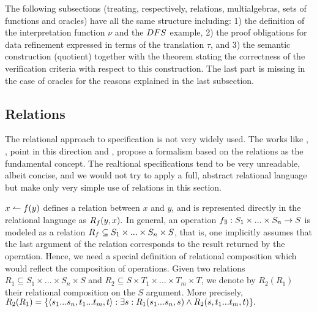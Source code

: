The following subsections (treating, respectively, relations, multialgebras, sets of
functions and oracles) have all the same structure including: 1) the definition of the
interpretation function $\nu$ and the $DFS$ example, 2) the proof obligations
for data refinement expressed in terms of the translation $\tau$, and 3) the semantic construction (quotient) together with the theorem stating the correctness of the verification criteria with respect to this construction. The last part is missing in the case of oracles for the reasons explained in the last subsection.


\subsection{Relations}
The relational approach to specification is not very widely used. The works like \cite{Brnc}, \cite{Brbpl}, \cite{Stark} point in this direction and \cite{Hoog}, \cite{Pers} propose a formalism based on the 
relations as the fundamental concept. The realtional specifications tend to be very unreadable, albeit concise, and we would not try to apply a full, abstract
relational language but make only very simple use of relations in this section.

$x\leftharpoonup f(y)$ defines a relation between $x$ and $y$, and is represented directly in the relational language as $R_{f}(y,x).$ In general, an operation $f_\exists:S_1\times ...\times S_n\rightarrow S$ is modeled as a relation
$R_{f}\subseteq S_1\times ...\times S_n\times S$, that is, one implicitly assumes that the last argument of the relation corresponds to the result returned by the operation. Hence, we need a special definition of relational composition which would reflect the composition of operations. Given two relations $R_1\subseteq S_1\times ...\times S_n\times S$ and $R_2\subseteq S\times T_1\times ...\times T_m\times T$, we denote by $R_2(R_1)$
their relational composition on the $S$ argument. More precisely, $R_2(R_1)=\{\langle s_1...s_n,t_1...t_m,t\rangle:\exists s: R_1(s_1...s_n,s)\land 
R_2(s,t_1...t_m,t)\}.$

